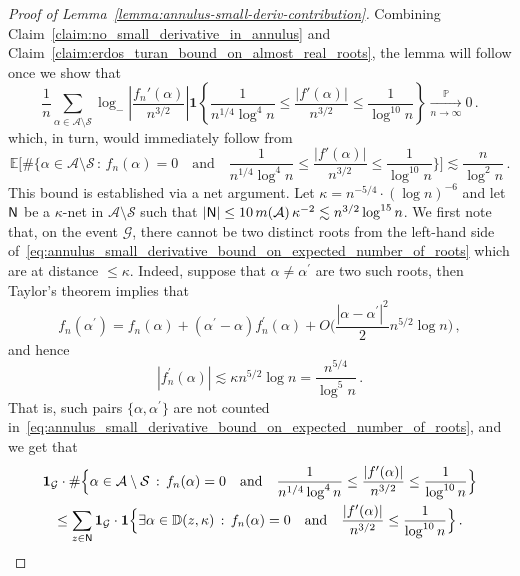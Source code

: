 \documentclass[11pt]{amsart}
\theoremstyle{remark}
\theoremstyle{definition}
\newcommand{\bD}{\mathbb D}
\newcommand{\bP}{\mathbb P}
\newcommand{\bE}{\mathbb E}
\newcommand{\cA}{\mathcal A}
\newcommand{\cG}{\mathcal G}
\newcommand{\one}{\boldsymbol{1}}
\begin{document}
    \begin{proof}[Proof of Lemma~\ref{lemma:annulus-small-deriv-contribution}]
     Combining Claim~\ref{claim:no_small_derivative_in_annulus} and Claim~\ref{claim:erdos_turan_bound_on_almost_real_roots}, the lemma will follow once we show that
    \begin{equation*}
            \frac{1}{n} \sum_{\alpha\in \mathcal{A}\setminus \mathcal{S}}\log_{-}\left|\frac{f_n'(\alpha)}{n^{3/2}} \right| \one\left\{\frac{1}{n^{1/4}\log^4 n} \le \frac{|f'(\alpha)|}{n^{3/2}} \leq \frac{1}{\log^{10} n} \right\} \xrightarrow[n \to \infty]{\bP} 0 \, .
        \end{equation*}
     which, in turn, would immediately follow from 
    \begin{equation}
    \label{eq:annulus_small_derivative_bound_on_expected_number_of_roots}
        \bE \bigg[ \# \Big\{\alpha\in \mathcal{A} \setminus \mathcal{S} \, : \, f_n(\alpha) = 0 \quad \text{and} \quad \frac{1}{n^{1/4}\log^4 n} \le \frac{|f'(\alpha)|}{n^{3/2}} \leq \frac{1}{\log^{10} n} \Big\} \bigg] \lesssim \frac{n}{\log^2 n} \, . 
    \end{equation}
    This bound is established via a net argument. Let $\kappa = n^{-5/4}\cdot(\log n)^{-6}$ and let ${\sf N}$ be a $\kappa$-net in $\cA\setminus \mathcal{S}$ such that $|{\sf N}|\le 10 \, m(\cA) \, \kappa^{-2} \lesssim n^{3/2} \log^{15} n$. We first note that, on the event $\cG$, there cannot be two distinct roots from the left-hand side of~\eqref{eq:annulus_small_derivative_bound_on_expected_number_of_roots} which are at distance $\le \kappa$. Indeed, suppose that $\alpha\not=\alpha^\prime$ are two such roots, then Taylor's theorem implies that
    \[
    f_n(\alpha^\prime) = f_n(\alpha) + (\alpha^\prime -\alpha) f_n^\prime(\alpha) + O\Big(\frac{|\alpha-\alpha^\prime|^2}{2} n^{5/2} \log n\Big) \, ,
    \]
    and hence
    \[
    |f_n^\prime(\alpha)| \lesssim \kappa n^{5/2} \log n  = \frac{n^{5/4}}{\log^5 n} \, .   
    \]
    That is, such pairs $\{\alpha,\alpha^\prime\}$ are not counted in~\eqref{eq:annulus_small_derivative_bound_on_expected_number_of_roots}, and we get that
    \begin{multline}
    \label{eq:bounding_expected_number_of_bad_roots_by_count_on_net}
    \one_\cG\cdot  \# \Big\{\alpha\in \mathcal{A} \setminus \mathcal{S} \, : \, f_n(\alpha) = 0 \quad \text{and} \quad \frac{1}{n^{1/4}\log^4 n} \le \frac{|f'(\alpha)|}{n^{3/2}} \leq \frac{1}{\log^{10} n} \Big\}  \\  \le \sum_{z\in {\sf N}} \one_\cG\cdot  \one \Big\{ \exists \alpha\in \bD(z,\kappa) \, : \, f_n(\alpha) = 0 \quad \text{and} \quad \frac{|f'(\alpha)|}{n^{3/2}} \leq \frac{1}{\log^{10} n} \Big\} \, .

\end{multline}
\end{proof}
\end{document}

